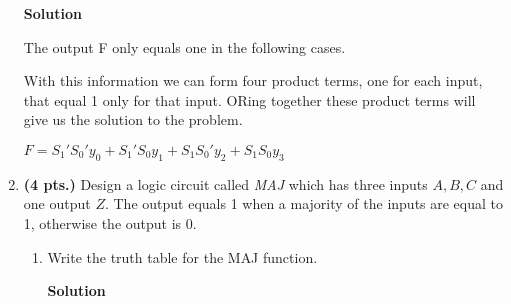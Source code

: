 \begin{enumerate}
                        \begin{onlysolution}  \textbf{Solution} \itshape

                            The output F only equals one in the following cases.

                            With this information we can form four product terms, one for each input,
                            that equal 1 only for that input.  ORing together these product terms
                            will give us the solution to the problem.

                            $F = S_1'S_0'y_0 + S_1'S_0 y_1 + S_1 S_0'y_2 + S_1 S_0 y_3$
                        \end{onlysolution}

                    \item  \textbf{ (4 pts.)} Design a logic circuit called \textit{MAJ} which
                        has three inputs $A,B,C$ and one output $Z$. The output equals 1
                        when a majority of the inputs are equal to 1, otherwise the output is 0.
                        \begin{enumerate}
                            \item Write the truth table for the MAJ function.

                                \begin{onlysolution}  \textbf{Solution} \itshape


\end{onlysolution}
\end{enumerate}
\end{enumerate}
